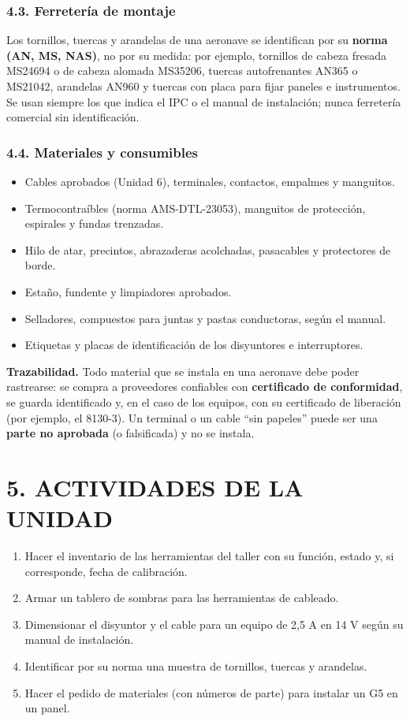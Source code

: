 \subsubsection*{4.3. Ferretería de montaje}
Los tornillos, tuercas y arandelas de una aeronave se identifican por su \textbf{norma (AN, MS,
NAS)}, no por su medida: por ejemplo, tornillos de cabeza fresada MS24694 o de cabeza alomada
MS35206, tuercas autofrenantes AN365 o MS21042, arandelas AN960 y tuercas con placa para fijar
paneles e instrumentos. Se usan siempre los que indica el IPC o el manual de instalación; nunca
ferretería comercial sin identificación.

\subsubsection*{4.4. Materiales y consumibles}
\begin{itemize}
  \item Cables aprobados (Unidad 6), terminales, contactos, empalmes y manguitos.
  \item Termocontraíbles (norma AMS-DTL-23053), manguitos de protección, espirales y fundas
        trenzadas.
  \item Hilo de atar, precintos, abrazaderas acolchadas, pasacables y protectores de borde.
  \item Estaño, fundente y limpiadores aprobados.
  \item Selladores, compuestos para juntas y pastas conductoras, según el manual.
  \item Etiquetas y placas de identificación de los disyuntores e interruptores.
\end{itemize}

\begin{recuadro}
\textbf{Trazabilidad.} Todo material que se instala en una aeronave debe poder rastrearse: se
compra a proveedores confiables con \textbf{certificado de conformidad}, se guarda identificado y,
en el caso de los equipos, con su certificado de liberación (por ejemplo, el 8130-3). Un terminal
o un cable ``sin papeles'' puede ser una \textbf{parte no aprobada} (o falsificada) y no se instala.
\end{recuadro}

\section*{5. ACTIVIDADES DE LA UNIDAD}
\begin{enumerate}
  \item Hacer el inventario de las herramientas del taller con su función, estado y, si
        corresponde, fecha de calibración.
  \item Armar un tablero de sombras para las herramientas de cableado.
  \item Dimensionar el disyuntor y el cable para un equipo de 2,5 A en 14 V según su manual de
        instalación.
  \item Identificar por su norma una muestra de tornillos, tuercas y arandelas.
  \item Hacer el pedido de materiales (con números de parte) para instalar un G5 en un panel.
\end{enumerate}
